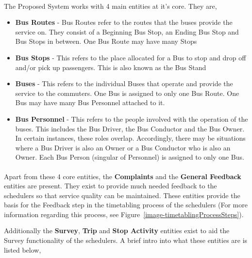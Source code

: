 \documentclass[12pt, oneside]{report}
\begin{document}
\paragraph{} The Proposed System works with 4 main entities at it's core. They are,

\begin {itemize}
\item \textbf{Bus Routes} - Bus Routes refer to the routes that the buses provide the service on. They consist of a Beginning Bus Stop, an Ending Bus Stop and Bus Stops in between. One Bus Route may have many Stops
\item \textbf{Bus Stops} - This refers to the place allocated for a Bus to stop and drop off and/or pick up passengers. This is also known as the Bus Stand
\item \textbf{Buses} - This refers to the individual Buses that operate and provide the service to the commuters. One Bus is assigned to only one Bus Route. One Bus may have many Bus Personnel attached to it.
\item \textbf{Bus Personnel} - This refers to the people involved with the operation of the buses. This includes the Bus Driver, the Bus Conductor and the Bus Owner. In certain instances, these roles overlap. Accordingly, there may be situations where a Bus Driver is also an Owner or a Bus Conductor who is also an Owner. Each Bus Person (singular of Personnel) is assigned to only one Bus.
\end {itemize}

\paragraph{} Apart from these 4 core entities, the \textbf{Complaints} and the \textbf{General Feedback} entities are present. They exist to provide much needed feedback to the schedulers so that service quality can be maintained. These entities provide the basis for the Feedback step in the timetabling process of the schedulers (For more information regarding this process, see Figure~\ref{image-timetablingProcessSteps}).

Additionally the \textbf{Survey}, \textbf{Trip} and \textbf{Stop Activity} entities exist to aid the Survey functionality of the schedulers. A brief intro into what these entities are is listed below,
\end{document}
